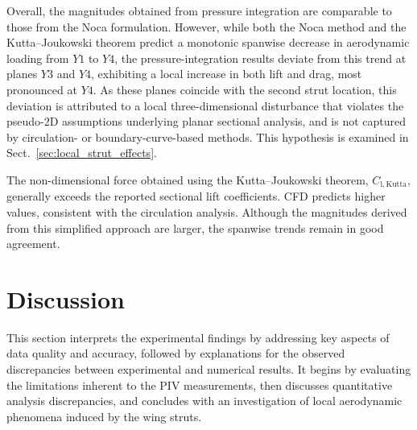 \documentclass[wes, manuscript]{copernicus}
\begin{document}
Overall, the magnitudes obtained from pressure integration are comparable 
to those from the Noca formulation. However, while both the Noca method and 
the Kutta--Joukowski theorem predict a monotonic spanwise decrease in 
aerodynamic loading from $Y1$ to $Y4$, the pressure-integration results 
deviate from this trend at planes $Y3$ and $Y4$, exhibiting a local 
increase in both lift and drag, most pronounced at $Y4$. As these planes 
coincide with the second strut location, this deviation is attributed to a 
local three-dimensional disturbance that violates the pseudo-2D 
assumptions underlying planar sectional analysis, and is not captured by 
circulation- or boundary-curve-based methods. This hypothesis is examined 
in Sect.~\ref{sec:local_strut_effects}.

The non-dimensional force obtained using the Kutta--Joukowski theorem, 
$C_{\mathrm{l,Kutta}}$, generally exceeds the reported sectional lift 
coefficients. CFD predicts higher values, consistent with the circulation 
analysis. Although the magnitudes derived from this simplified approach 
are larger, the spanwise trends remain in good agreement.
%
\section{Discussion}\label{sec:discussion}
%
This section interprets the experimental findings by addressing key aspects of data quality and accuracy, followed by explanations for the observed discrepancies between experimental and numerical results. 
It begins by evaluating the limitations inherent to the PIV measurements, then discusses quantitative analysis discrepancies, and concludes with an investigation of local aerodynamic phenomena induced by the wing struts. 
%
\end{document}
